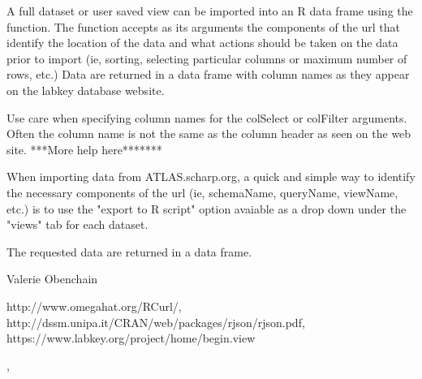\begin{Details}\relax
A full dataset or user saved view can be imported into an R data frame using the  
function. The function accepts as its arguments the components of the url that identify
the location of the data and what actions should be taken on the data prior to import
(ie, sorting, selecting particular columns or maximum number of rows, etc.) Data are returned in a data 
frame with column names as they appear on the labkey database website. 

Use care when specifying column names for the colSelect or colFilter arguments. Often the column name
is not the same as the column header as seen on the web site. ***More help here*******

When importing data from ATLAS.scharp.org, a quick and simple way to identify the necessary components of the url 
(ie, schemaName, queryName, viewName, etc.) is to use the "export to R script" option avaiable as a drop down
under the "views" tab for each dataset.
\end{Details}
\begin{Value}
The requested data are returned in a data frame.
\end{Value}
\begin{Author}\relax
Valerie Obenchain
\end{Author}
\begin{References}\relax
http://www.omegahat.org/RCurl/, 
http://dssm.unipa.it/CRAN/web/packages/rjson/rjson.pdf,
https://www.labkey.org/project/home/begin.view
\end{References}
\begin{SeeAlso}\relax
{}, 
\end{SeeAlso}
\begin{Examples}
\end{Examples}

